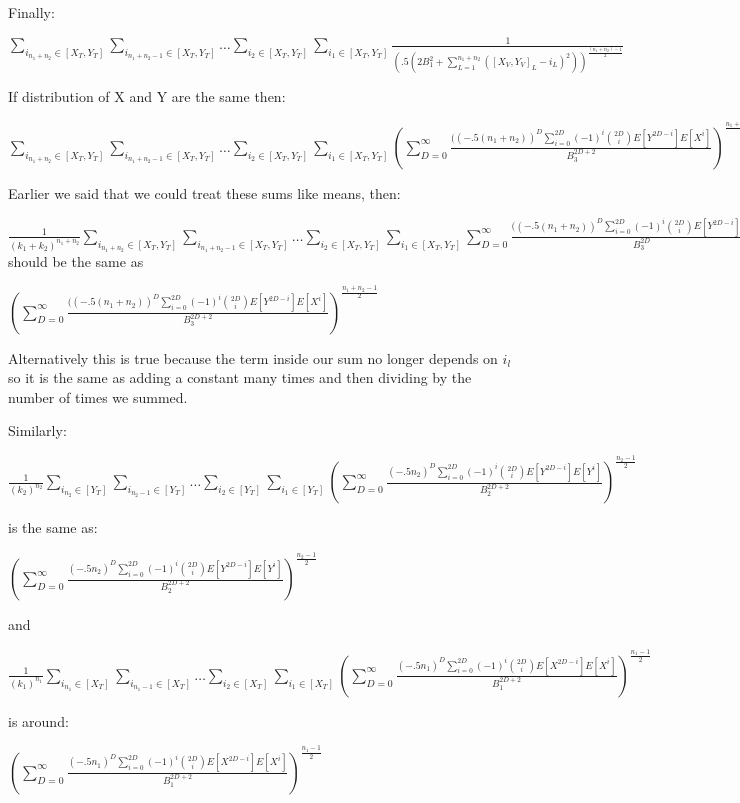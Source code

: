 \documentclass[11pt]{article}
\begin{document}
Finally: 

$ \sum_{i_{n_1+n_2} \in [X_T, Y_T]} \sum_{i_{n_1+n_2-1}\in [X_T, Y_T]} \ldots  \sum_{i_{2}\in [X_T, Y_T]} \sum_{i_{1}\in [X_T, Y_T]} \frac{1}{(.5(2B_1^2 +  \sum_{L=1}^{n_1+n_2} ([X_V, Y_V]_{L} - i_L)^2))^{\frac{(n_1+n_2)-1}{2}}} $

If distribution of X and Y are the same then:

$ \sum_{i_{n_1 + n_2} \in [X_T, Y_T]} \sum_{i_{n_1 + n_2-1}\in [X_T, Y_T]} \ldots  \sum_{i_{2}\in [X_T, Y_T]} \sum_{i_{1}\in [X_T, Y_T]} (\sum_{D=0}^\infty \frac{((-.5(n_1 + n_2))^D \sum_{i=0}^{2D} (-1)^i \binom{2D}{i}E[Y^{2D-i}]E[X^{i}]}{B_3^{2D+2}})^{\frac{n_1 + n_2 -1}{2}}  $ 

Earlier we said that we could treat these sums like means, then:

$ \frac{1}{(k_1+k_2)^{n_1+n_2}} \sum_{i_{n_1 + n_2} \in [X_T, Y_T]} \sum_{i_{n_1 + n_2-1}\in [X_T, Y_T]} \ldots  \sum_{i_{2}\in [X_T, Y_T]} \sum_{i_{1}\in [X_T, Y_T]} \sum_{D=0}^\infty \frac{((-.5(n_1 + n_2))^D \sum_{i=0}^{2D} (-1)^i \binom{2D}{i}E[Y^{2D-i}]E[X^{i}]}{B_3^{2D}}  $ should be the same as 

$(\sum_{D=0}^\infty \frac{((-.5(n_1 + n_2))^D \sum_{i=0}^{2D} (-1)^i \binom{2D}{i}E[Y^{2D-i}]E[X^{i}]}{B_3^{2D+2}})^{\frac{n_1+n_2 - 1}{2}} $

Alternatively this is true because the term inside our sum no longer depends on $i_l$ so it is the same as adding a constant many times and then dividing by the number of times we summed.

Similarly:

 $ \frac{1}{(k_2)^{n_2}} \sum_{i_{n_2} \in [Y_T]} \sum_{i_{n_2-1}\in [Y_T]} \ldots  \sum_{i_{2}\in [Y_T]} \sum_{i_{1}\in [Y_T]} (\sum_{D=0}^\infty \frac{(-.5n_2)^D \sum_{i=0}^{2D} (-1)^i \binom{2D}{i}E[Y^{2D-i}]E[Y^{i}]}{B_2^{2D+2}})^{\frac{n_2 - 1}{2}}    $

is the same as:

$(\sum_{D=0}^\infty \frac{(-.5n_2)^D \sum_{i=0}^{2D} (-1)^i \binom{2D}{i}E[Y^{2D-i}]E[Y^{i}]}{B_2^{2D+2}})^{\frac{n_2 - 1}{2}} $

and 

 $ \frac{1}{(k_1)^{n_1}} \sum_{i_{n_1} \in [X_T]} \sum_{i_{n_1-1}\in [X_T]} \ldots  \sum_{i_{2}\in [X_T]} \sum_{i_{1}\in [X_T]}  (\sum_{D=0}^\infty \frac{(-.5n_1)^D \sum_{i=0}^{2D} (-1)^i \binom{2D}{i}E[X^{2D-i}]E[X^{i}]}{B_1^{2D+2}})^{\frac{n_1 - 1}{2}}   $

is around: 

$(\sum_{D=0}^\infty \frac{(-.5n_1)^D \sum_{i=0}^{2D} (-1)^i \binom{2D}{i}E[X^{2D-i}]E[X^{i}]}{B_1^{2D+2}})^{\frac{n_1 - 1}{2}}$ 
\end{document}
